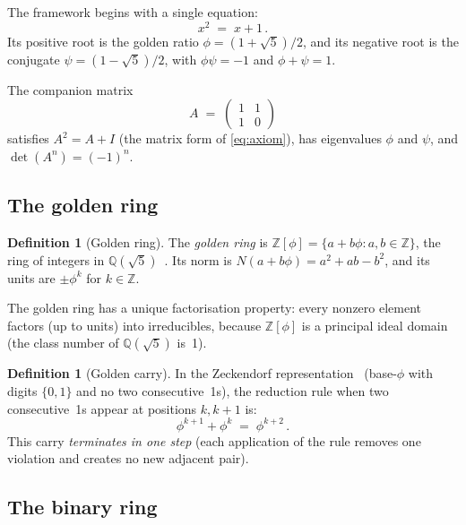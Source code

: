 \documentclass[12pt, a4paper]{article}
\theoremstyle{plain}
\theoremstyle{definition}
\newtheorem{definition}[theorem]{Definition}
\theoremstyle{remark}
\newcommand{\Z}{\mathbb{Z}}
\newcommand{\Q}{\mathbb{Q}}
\newcommand{\Zphi}{\Z[\phi]}
\DeclareMathOperator{\det}{det}
\begin{document}
The framework begins with a single equation:
\begin{equation}\label{eq:axiom}
  x^2 \;=\; x + 1\,.
\end{equation}
Its positive root is the golden ratio
$\phi = (1 + \sqrt{5})/2$, and its negative root is the conjugate
$\psi = (1 - \sqrt{5})/2$, with $\phi\psi = -1$ and $\phi + \psi = 1$.

The companion matrix
\begin{equation}\label{eq:fib-matrix}
  A \;=\; \begin{pmatrix} 1 & 1 \\ 1 & 0 \end{pmatrix}
\end{equation}
satisfies $A^2 = A + I$ (the matrix form of \eqref{eq:axiom}), has
eigenvalues $\phi$ and $\psi$, and $\det(A^n) = (-1)^n$.

\subsection{The golden ring}

\begin{definition}[Golden ring]\label{def:golden-ring}
The \emph{golden ring} is
$\Zphi = \{a + b\phi : a, b \in \Z\}$,
the ring of integers in $\Q(\sqrt{5})$~\cite{artin2011}.
Its norm is $N(a + b\phi) = a^2 + ab - b^2$, and its units are
$\pm\phi^k$ for $k \in \Z$.
\end{definition}

The golden ring has a unique factorisation property: every nonzero
element factors (up to units) into irreducibles, because $\Z[\phi]$ is
a principal ideal domain (the class number of $\Q(\sqrt{5})$ is~1).

\begin{definition}[Golden carry]\label{def:golden-carry}
In the Zeckendorf representation~\cite{zeckendorf1972} (base-$\phi$ with
digits $\{0,1\}$ and no two consecutive~1s), the reduction rule when two
consecutive~1s
appear at positions $k, k+1$ is:
\begin{equation}\label{eq:golden-carry}
  \phi^{k+1} + \phi^k \;=\; \phi^{k+2}\,.
\end{equation}
This carry \emph{terminates in one step} (each application of the
rule removes one violation and creates no new adjacent pair).
\end{definition}

\subsection{The binary ring}
\end{document}
